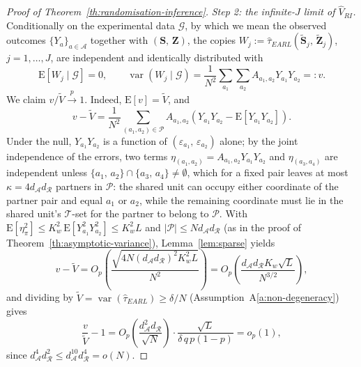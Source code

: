 \documentclass[sigconf,nonacm]{acmart}
\newcommand{\E}{\mathrm E}
\DeclareMathOperator{\var}{var}
\begin{document}
\begin{proof}[Proof of Theorem~\ref{th:randomisation-inference}]
    \emph{Step 2: the infinite-$J$ limit of $\hat V_{RI}$.} Conditionally on the experimental data $\mathcal G$, by which we mean the observed outcomes $\{Y_a\}_{a\in\mathcal A}$ together with $(\mathbf S,\,\mathbf Z)$, the copies $W_j := \hat\tau_{EARL}(\tilde{\mathbf S}_j,\,\tilde{\mathbf Z}_j)$, $j=1,\ldots,J$, are independent and identically distributed with
    \begin{equation}\label{eq:vD}
        \E[W_j\mid \mathcal G] = 0,\qquad \var(W_j\mid\mathcal G) = \frac 1{N^2}\sum_{a_1}\sum_{a_2}A_{a_1,a_2}Y_{a_1}Y_{a_2} =: v.
    \end{equation}
    We claim $v/\tilde V\stackrel{p}{\to}1$. Indeed, $\E[v]=\tilde V$, and
    \begin{equation*}
        v - \tilde V = \frac 1{N^2}\sum_{(a_1,a_2)\in\mathcal P}A_{a_1,a_2}\left(Y_{a_1}Y_{a_2} - \E[Y_{a_1}Y_{a_2}]\right).
    \end{equation*}
    Under the null, $Y_{a_1}Y_{a_2}$ is a function of $(\varepsilon_{a_1},\,\varepsilon_{a_2})$ alone; by the joint independence of the errors, two terms $\eta_{(a_1,a_2)} = A_{a_1,a_2}Y_{a_1}Y_{a_2}$ and $\eta_{(a_3,a_4)}$ are independent unless $\{a_1,\,a_2\}\cap\{a_3,\,a_4\}\neq\emptyset$, which for a fixed pair leaves at most $\kappa = 4d_{\mathcal A}d_{\mathcal R}$ partners in $\mathcal P$: the shared unit can occupy either coordinate of the partner pair and equal $a_1$ or $a_2$, while the remaining coordinate must lie in the shared unit's $\mathcal T$-set for the partner to belong to $\mathcal P$. With $\E[\eta_\pi^2]\le K_w^2\,\E[Y_{a_1}^2Y_{a_2}^2]\le K_w^2L$ and $|\mathcal P|\le Nd_{\mathcal A}d_{\mathcal R}$ (as in the proof of Theorem~\ref{th:asymptotic-variance}), Lemma~\ref{lem:sparse} yields
    \begin{equation*}
        v - \tilde V = O_p\left(\frac{\sqrt{4N(d_{\mathcal A}d_{\mathcal R})^2K_w^2L}}{N^2}\right) = O_p\left(\frac{d_{\mathcal A}d_{\mathcal R}K_w\sqrt L}{N^{3/2}}\right),
    \end{equation*}
    and dividing by $\tilde V = \var(\hat\tau_{EARL})\ge \delta/N$ (Assumption~A\ref{a:non-degeneracy}) gives
    \begin{equation}\label{eq:v-ratio}
        \frac{v}{\tilde V} - 1 = O_p\left(\frac{d^2_{\mathcal A}d_{\mathcal R}}{\sqrt N}\right)\cdot\frac{\sqrt L}{\delta\, q\,p(1-p)} = o_p(1),
    \end{equation}
    since $d^4_{\mathcal A}d^2_{\mathcal R}\le d^{10}_{\mathcal A}d^4_{\mathcal R} = o(N)$.


\end{proof}
\end{document}
